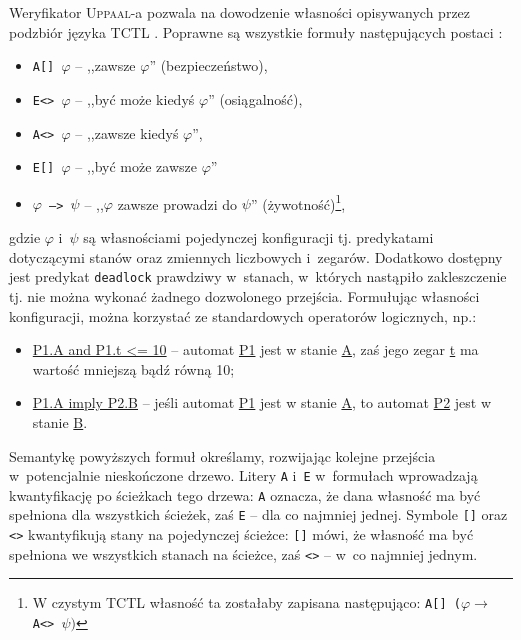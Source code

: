 \documentclass{pracamgr}
\newcommand{\upp}{\textsc{Uppaal}}
\theoremstyle{plain}
\begin{document}
Weryfikator \upp-a pozwala na dowodzenie własności opisywanych przez
podzbiór języka TCTL \cite{acd:mc}. Poprawne są wszystkie formuły
następujących postaci \cite{by-lncs04}:
\begin{itemize}
  \item \texttt{A[] $\varphi$} -- ,,zawsze $\varphi$'' (bezpieczeństwo),
  \item \texttt{E<> $\varphi$} -- ,,być może kiedyś $\varphi$''
  (osiągalność),
  \item \texttt{A<> $\varphi$} -- ,,zawsze kiedyś $\varphi$'',
  \item \texttt{E[] $\varphi$} -- ,,być może zawsze $\varphi$''
  \item \texttt{$\varphi$ --> $\psi$} -- ,,$\varphi$ zawsze
  prowadzi do $\psi$'' (żywotność)\footnote{W czystym TCTL własność
    ta zostałaby zapisana następująco: \texttt{A[]
      ($\varphi\rightarrow$ A<> $\psi)$}},
\end{itemize}
gdzie $\varphi$ i~$\psi$ są własnościami pojedynczej konfiguracji
tj. predykatami dotyczącymi stanów oraz zmiennych liczbowych
i~zegarów. Dodatkowo dostępny jest predykat \texttt{deadlock} prawdziwy
w~stanach, w~których nastąpiło zakleszczenie tj. nie można wykonać
żadnego dozwolonego przejścia. Formułując własności konfiguracji,
można korzystać ze standardowych operatorów logicznych, np.:

\begin{samepage}
\begin{itemize}
  \item \url{P1.A and P1.t <= 10} -- automat \url{P1} jest w stanie
  \url{A}, zaś jego zegar \url{t} ma wartość mniejszą bądź równą 10;
  \item \url{P1.A imply P2.B} -- jeśli automat \url{P1} jest w stanie
  \url{A}, to automat \url{P2} jest w stanie \url{B}.
\end{itemize}
\end{samepage}

Semantykę powyższych formuł określamy, rozwijając kolejne
przejścia w~potencjalnie nieskończone drzewo. Litery \texttt{A}
i~\texttt{E} w~formułach wprowadzają kwantyfikację po ścieżkach tego drzewa:
\texttt{A} oznacza, że dana własność ma być spełniona dla wszystkich
ścieżek, zaś \texttt{E} -- dla co najmniej jednej. Symbole
\texttt{[]} oraz \texttt{<>} kwantyfikują stany na pojedynczej
ścieżce: \texttt{[]} mówi, że własność ma być spełniona we wszystkich
stanach na ścieżce, zaś \texttt{<>} -- w~co najmniej jednym.
\end{document}
